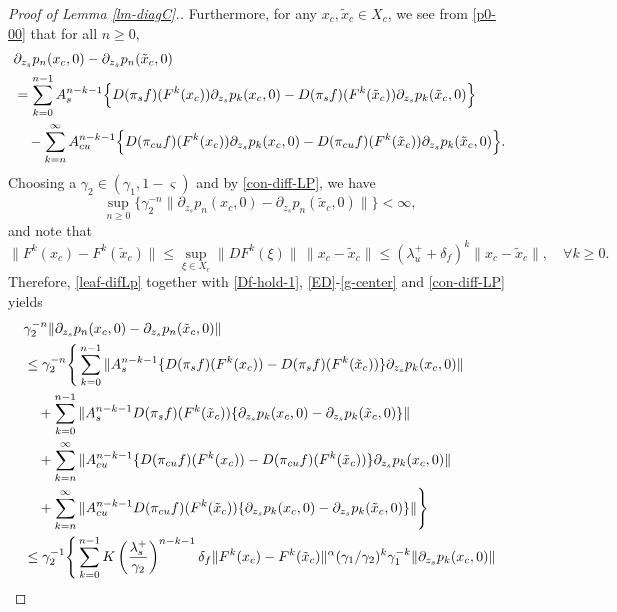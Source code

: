 \documentclass[reqno]{amsart}
\numberwithin{equation}{section}
\begin{document}
\begin{proof}[Proof of Lemma {\rm \ref{lm-diagC}}.]
Furthermore, for any $x_c,\tilde x_c\in X_c$,   we see
 from \eqref{p0-00} that   for all $n\ge 0$, 
\begin{align}\label{leaf-difLp}
&\partial_{z_s} p_n(x_{c},0)-\partial_{z_s} p_n(\tilde x_{c},0)   
\notag \\
&= \sum_{k=0}^{n-1} A_s^{n-k-1} \Big\{  D(\pi_s f)(F^k(x_{c}))\partial_{z_s}p_k(x_{c},0) - D(\pi_s f)(F^k(\tilde x_{c}) )\partial_{z_s} p_k(\tilde x_{c},0)\Big\}
\notag \\
& \quad -  \sum_{k=n}^\infty A_{cu}^{n-k-1} \Big\{  D(\pi_{cu} f)(F^k(x_{c}))\partial_{z_s}p_k(x_{c},0) - D(\pi_{cu} f)(F^k(\tilde x_{c}) )\partial_{z_s} p_k(\tilde x_{c},0)\Big\}.
\end{align}
Choosing a $\gamma_2\in (\gamma_1,1-\varsigma)$ and by \eqref{con-diff-LP}, we have
$$
\sup_{n\ge 0}\{\gamma_2^{-n} \|\partial_{z_s} p_n(x_c,0)-\partial_{z_s} p_n(\tilde x_c,0)\|\}<\infty,
$$
and note that
$$
\|F^k(x_c)-F^k(\tilde x_c)\|\le \sup_{\xi\in X_c}\|DF^k(\xi)\|\,\|x_c-\tilde x_c\|\le (\lambda_u^+ +\delta_f)^k\|x_c-\tilde x_c\|,\quad \forall k\ge 0.
$$
Therefore,   \eqref{leaf-difLp}  together with \eqref{Df-hold-1}, \eqref{ED}-\eqref{g-center} and \eqref{con-diff-LP} yields 
\begin{align}\label{holder-psn}
& \gamma_2^{-n}     \|\partial_{z_s} p_n(x_c,0)-\partial_{z_s} p_n(\tilde x_c,0)\|
\notag \\
&\le  \gamma_2^{-n} \Bigg\{ \sum_{k=0}^{n-1} \|A_s^{n-k-1} \{ D(\pi_s f)(F^k(x_{c}) )-D(\pi_s f)(F^k(\tilde x_{c}) )   \} \partial_{z_s} p_k(x_{c},0)  \|
\notag \\
&\quad + \sum_{k=0}^{n-1} \|A_s^{n-k-1} D(\pi_s f)(F^k(\tilde x_{c}) ) \{ \partial_{z_s} p_k(x_{c},0) -\partial_{z_s} p_k(\tilde x_{c},0) \}\|
\notag \\
&\quad + \sum_{k=n}^\infty \|A_{cu}^{n-k-1} \{ D(\pi_{cu} f)(F^k(x_{c}) )-D(\pi_{cu} f)(F^k(\tilde x_{c}) )   \} \partial_{z_s} p_k(x_{c},0)  \|
\notag \\
&\quad + \sum_{k=n}^\infty \|A_{cu}^{n-k-1} D(\pi_{cu} f)(F^k(\tilde x_{c}) ) \{ \partial_{z_s} p_k(x_{c},0) -\partial_{z_s} p_k(\tilde x_{c},0) \}\| \Bigg\}
\notag \\
&\le \gamma_2^{-1} \Bigg\{ \sum_{k=0}^{n-1} K \left(\frac{\lambda_s^+}{\gamma_2}\right)^{n-k-1} \delta_f \|F^k(x_c)-F^k(\tilde x_c)\|^\alpha (\gamma_1/\gamma_2)^k\gamma_1^{-k} \|\partial_{z_s} p_k(x_c,0)\| 
\notag \\

\end{align}
\end{proof}
\end{document}
